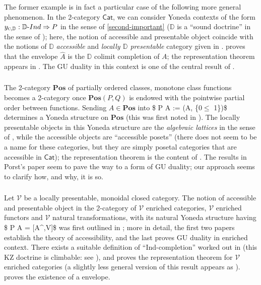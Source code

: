 \documentclass[11pt]{article}
\def\Cat{\mathsf{Cat}}
\def\To{\Rightarrow}
\def\opp{\mathrm{op}}
\theoremstyle{reference}
\begin{document}
\begin{prop}
The former example is in fact a particular case of the following more general phenomenon. In the 2-category \(\Cat\), we can consider Yoneda contexts of the form \(y_{\textsc{c},\mathbb D} : \mathbb D\text{-}Ind \To  P\) in the sense of \autoref{second-important} (\(\mathbb D\) is a ``sound doctrine'' in the sense of \cite{adamek2002classification}); here, the notion of accessible and presentable object coincide with the notions of \(\mathbb D\) \emph{accessible} and \emph{locally $\mathbb D$ presentable} category given in \cite{adamek2002classification}. \cite[76]{centazzo2004generalised} proves that the \gu envelope \(\widehat A\) is the \(\mathbb D\) colimit completion of \(A\); the representation theorem appears in \cite[78]{centazzo2004generalised}. The GU duality in this context is one of the central result of \cite{centazzo2004generalised}.

\subsubsection{}
\label{sec:org1c3a0b8}

The 2-category \(\mathbf{Pos}\) of partially ordered classes, monotone class functions becomes a 2-category once \(\mathbf{Pos}(P,Q)\) is endowed with the pointwise partial order between functions. Sending \(A\in\mathbf{Pos}\) into \$ P A := (A, \{0\(\le\) 1\})\$ determines a Yoneda structure on \(\mathbf{Pos}\) (this was first noted in \cite{street1978yoneda}). The locally presentable objects in this Yoneda structure are the \emph{algebraic lattices} in the sense of \cite{porst2011algebraic}, while the accessible objects are ``accessible posets'' (there does not seem to be a name for these categories, but they are simply posetal categories that are accessible in \(\Cat\)); the representation theorem is the content of \cite{porst2011algebraic}. The results in Porst's paper seem to pave the way to a form of GU duality; our approach seems to clarify how, and why, it is so.

\subsubsection{}
\label{sec:org4c78d83}

Let \(\mathcal V\) be a locally presentable, monoidal closed category. The notion of accessible and presentable object in the 2-category of \(\mathcal V\) enriched categories, \(\mathcal V\) enriched functors and \(\mathcal V\) natural transformations, with its natural Yoneda structure having \$ P A = [A\^{}\opp,\mathcal V]\$ was first outlined in \cite{borceux1996enriched,borceux1998theory,kelly1982structures}; more in detail, the first two papers establish the theory of accessibility, and the last proves GU duality in enriched context. There exists a suitable definition of ``Ind-completion'' worked out in \cite{borceux1998theory} (this KZ doctrine is climbable: see \cite[2.4]{kelly1982structures}), and \cite[Cor. 3.6]{borceux1996enriched} proves the representation theorem for \(\mathcal V\) enriched categories (a slightly less general version of this result appears as \cite[7.3]{kelly1982structures}). \cite[9.3]{kelly1982structures} proves the existence of a \gu envelope. 


\end{prop}
\end{document}
